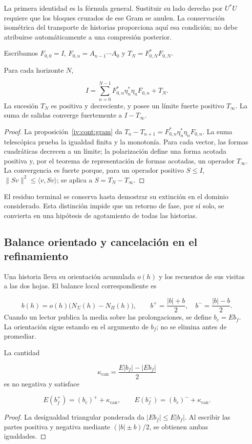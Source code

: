La primera identidad es la fórmula general. Sustituir su lado derecho por \(U^*U\) requiere que los bloques cruzados de ese Gram se anulen. La conservación isométrica del transporte de historias proporciona aquí esa condición; no debe atribuirse automáticamente a una compresión posterior.

Escribamos \(F_{0,0}=I\), \(F_{0,n}=A_{n-1}\cdots A_0\) y \(T_N=F_{0,N}^*F_{0,N}\).

\begin{theorem}
\label{iv:cont:terminal}
Para cada horizonte \(N\),

\[
I=\sum_{n=0}^{N-1}
F_{0,n}^*\eta_n^*\eta_nF_{0,n}+T_N.
\]
La sucesión \(T_N\) es positiva y decreciente, y posee un límite fuerte positivo \(T_\infty\). La suma de salidas converge fuertemente a \(I-T_\infty\).

\end{theorem}
\begin{proof}
La proposición~\ref{iv:cont:gram} da \(T_n-T_{n+1}=F_{0,n}^*\eta_n^*\eta_nF_{0,n}\). La suma telescópica prueba la igualdad finita y la monotonía. Para cada vector, las formas cuadráticas decrecen a un límite; la polarización define una forma acotada positiva y, por el teorema de representación de formas acotadas, un operador \(T_\infty\). La convergencia es fuerte porque, para un operador positivo \(S\leq I\), \(\|Sv\|^2\leq\langle v,Sv\rangle\); se aplica a \(S=T_N-T_\infty\).
\end{proof}

El residuo terminal se conserva hasta demostrar su extinción en el dominio considerado. Esta distinción impide que un retorno de fase, por sí solo, se convierta en una hipótesis de agotamiento de todas las historias.

\subsection{Balance orientado y cancelación en el refinamiento}
\label{iv:cont:balance}
Una historia lleva su orientación acumulada \(o(h)\) y los recuentos de sus visitas a las dos hojas. El balance local correspondiente es

\[
b(h)=o(h)\bigl(N_\Sigma(h)-N_\Pi(h)\bigr),
\qquad
b^+=\frac{|b|+b}{2},\quad b^-=\frac{|b|-b}{2}.
\]
Cuando un lector publica la media sobre las prolongaciones, se define \(b_c=Eb_f\). La orientación sigue estando en el argumento de \(b_f\); no se elimina antes de promediar.

\begin{proposition}
\label{iv:cont:cancelacion}
La cantidad

\[
\kappa_{\mathrm{can}}=
\frac{E|b_f|-|Eb_f|}{2}
\]
es no negativa y satisface

\[
E(b_f^+)=(b_c)^++\kappa_{\mathrm{can}},
\qquad
E(b_f^-)=(b_c)^-+\kappa_{\mathrm{can}}.
\]
\end{proposition}
\begin{proof}
La desigualdad triangular ponderada da \(|Eb_f|\leq E|b_f|\). Al escribir las partes positiva y negativa mediante \((|b|\pm b)/2\), se obtienen ambas igualdades.
\end{proof}

